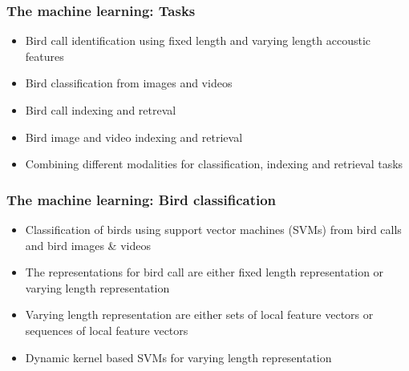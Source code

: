 \documentclass[mathserif]{beamer}
\begin{document}
\begin{frame}
\frametitle{The machine learning: Tasks}
\begin{itemize}
\item<2-> Bird call identification using fixed length and varying length accoustic features 
\item<3-> Bird classification from images and videos
\item<4-> Bird call indexing and retreval
\item<5-> Bird image and video indexing and retrieval
\item<6-> Combining different modalities for classification, indexing and retrieval tasks
\end{itemize}
\end{frame}

\begin{frame}
\frametitle{The machine learning: Bird classification}
\begin{itemize}
\item<2-> Classification of birds using support vector machines (SVMs) from bird calls and bird images \& videos
\item<3-> The representations for bird call are either fixed length representation or varying length representation
\item<4-> Varying length representation are either sets of local feature vectors or sequences of local feature vectors
\item<5-> Dynamic kernel based SVMs for varying length representation
\end{itemize}
\end{frame}
\end{document}
